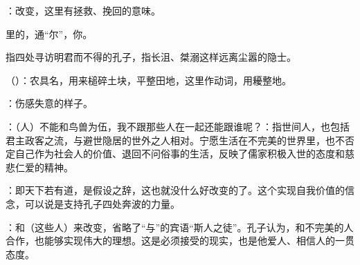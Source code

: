 {：改变，这里有拯救、挽回的意味。
\item {}里的，通“尔”，你。
\item {}指四处寻访明君而不得的孔子，指长沮、桀溺这样远离尘嚣的隐士。
\item {}（）：农具名，用来槌碎土块，平整田地，这里作动词，用耰整地。
\item {}：伤感失意的样子。
\item {}：（人）不能和鸟兽为伍，我不跟那些人在一起还能跟谁呢？：指世间人，也包括君主政客之流，与避世隐居的世外之人相对。宁愿生活在不完美的世界里，也不否定自己作为社会人的价值、退回不问俗事的生活，反映了儒家积极入世的态度和慈悲仁爱的精神。
\item {}：即天下若有道，是假设之辞，这也就没什么好改变的了。这个实现自我价值的信念，可以说是支持孔子四处奔波的力量。
\item {}：和（这些人）来改变，省略了“与”的宾语“斯人之徒”。孔子认为，和不完美的人合作，也能够实现伟大的理想。这是必须接受的现实，也是他爱人、相信人的一贯态度。
}
{}  %


